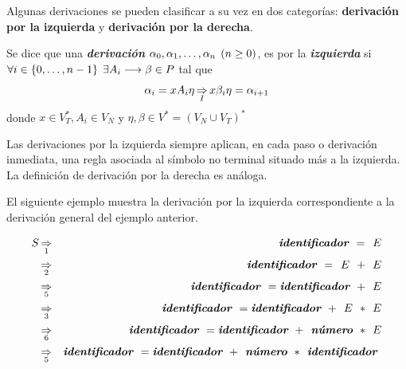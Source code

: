 Algunas derivaciones se pueden clasificar a su vez en dos categorías: \textbf{derivación por la izquierda} y \textbf{derivación por la derecha}.

\begin{definicion}
 Se dice que una {\bf\em derivación} $\alpha_0, \alpha_1, \dots, \alpha_n \hspace{1ex} (n \geq 0)$, es por la {\bf\em izquierda} si $\forall i \in \{0, \dots, n-1\} \hspace{1ex} \exists A_i \longrightarrow \beta \in P$  tal que
\begin{equation}
 \alpha_i = x  A_i \eta \mathop{\Rightarrow}\limits_I x \beta_i \eta = \alpha_{i+1} 
\end{equation}
 donde $x \in V^*_T, A_i \in V_N$ y $\eta, \beta \in V^* = (V_N \cup V_T)^*$
\end{definicion}

 Las derivaciones por la izquierda siempre aplican, en cada paso o derivación inmediata, una regla asociada al símbolo no terminal situado más a la izquierda. La definición de derivación por la derecha es análoga.

El siguiente ejemplo muestra la derivación por la izquierda correspondiente a la derivación general del ejemplo anterior.

\begin{eqnarray*}
  S  & \mathop{\Rightarrow}\limits_1 & \mbox{\bf\em identificador } = \hspace{1ex} E \\
     & \mathop{\Rightarrow}\limits_2 & \mbox{\bf\em identificador } = \hspace{1ex} E \hspace{1ex} + \hspace{1ex} E \\
     & \mathop{\Rightarrow}\limits_5 & \mbox{\bf\em identificador } = \mbox{\bf\em identificador} \hspace{1ex} + \hspace{1ex} E \\
     & \mathop{\Rightarrow}\limits_3 & \mbox{\bf\em identificador } = \mbox{\bf\em identificador }  + \hspace{1ex} E \hspace{1ex} * \hspace{1ex} E \\
     & \mathop{\Rightarrow}\limits_6 & \mbox{\bf\em identificador } = \mbox{\bf\em identificador } + \hspace{1ex} \mbox{\bf\em número } * \hspace{1ex} E \\
     & \mathop{\Rightarrow}\limits_5 & \mbox{\bf\em identificador } = \mbox{\bf\em identificador } + \hspace{1ex} \mbox{\bf\em número } * \hspace{1ex} \mbox{\bf\em identificador } 
\end{eqnarray*}


